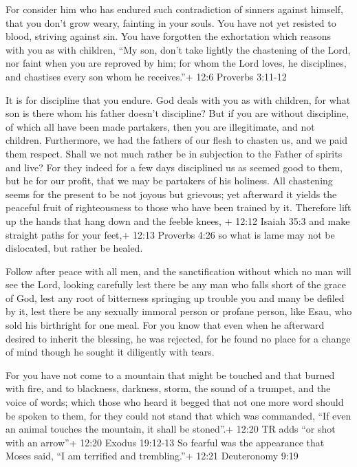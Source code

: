  For consider him who has endured such contradiction of
sinners against himself, that you don't grow weary, fainting in your
souls.  You have not yet resisted to blood, striving against
sin.  You have forgotten the exhortation which reasons with
you as with children, ``My son, don't take lightly the chastening of the
Lord, nor faint when you are reproved by him;  for whom the
Lord loves, he disciplines, and chastises every son whom he receives.''+
12:6 Proverbs 3:11-12

 It is for discipline that you endure. God deals with you as
with children, for what son is there whom his father doesn't discipline?
 But if you are without discipline, of which all have been
made partakers, then you are illegitimate, and not children.
 Furthermore, we had the fathers of our flesh to chasten us,
and we paid them respect. Shall we not much rather be in subjection to
the Father of spirits and live?  For they indeed for a few
days disciplined us as seemed good to them, but he for our profit, that
we may be partakers of his holiness.  All chastening seems
for the present to be not joyous but grievous; yet afterward it yields
the peaceful fruit of righteousness to those who have been trained by
it.  Therefore lift up the hands that hang down and the
feeble knees, + 12:12 Isaiah 35:3  and make straight paths
for your feet,+ 12:13 Proverbs 4:26 so what is lame may not be
dislocated, but rather be healed.

 Follow after peace with all men, and the sanctification
without which no man will see the Lord,  looking carefully
lest there be any man who falls short of the grace of God, lest any root
of bitterness springing up trouble you and many be defiled by it,
 lest there be any sexually immoral person or profane
person, like Esau, who sold his birthright for one meal. 
For you know that even when he afterward desired to inherit the
blessing, he was rejected, for he found no place for a change of mind
though he sought it diligently with tears.

 For you have not come to a mountain that might be touched
and that burned with fire, and to blackness, darkness, storm,
 the sound of a trumpet, and the voice of words; which
those who heard it begged that not one more word should be spoken to
them,  for they could not stand that which was commanded,
``If even an animal touches the mountain, it shall be stoned''.+ 12:20
TR adds ``or shot with an arrow''+ 12:20 Exodus 19:12-13 
So fearful was the appearance that Moses said, ``I am terrified and
trembling.''+ 12:21 Deuteronomy 9:19

